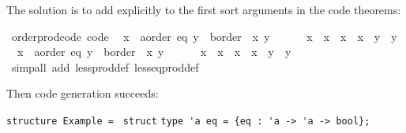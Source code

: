 \begin{isabellebody}
\begin{isamarkuptext}
  The solution is to add  explicitly to the first sort arguments in the
  code theorems:%
\end{isamarkuptext}%
\isamarkuptrue%
%
\isadelimquoteme
%
\endisadelimquoteme
%
\isatagquoteme
{}\isamarkupfalse%
\ order{\isacharunderscore}prod{\isacharunderscore}code\ {\isacharbrackleft}code{\isacharbrackright}{\isacharcolon}\isanewline
\ \ {\isachardoublequoteopen}{\isacharparenleft}x{}\ {\isasymColon}\ {\isacharprime}a{\isasymColon}{\isacharbraceleft}order{\isacharcomma}\ eq{\isacharbraceright}{\isacharcomma}\ y{}\ {\isasymColon}\ {\isacharprime}b{\isasymColon}order{\isacharparenright}\ {\isacharless}\ {\isacharparenleft}x{}{\isacharcomma}\ y{}{\isacharparenright}\ {\isasymlongleftrightarrow}\isanewline
\ \ \ \ \ x{}\ {\isacharless}\ x{}\ {\isasymor}\ x{}\ {\isacharequal}\ x{}\ {\isasymand}\ y{}\ {\isacharless}\ y{}{\isachardoublequoteclose}\isanewline
\ \ {\isachardoublequoteopen}{\isacharparenleft}x{}\ {\isasymColon}\ {\isacharprime}a{\isasymColon}{\isacharbraceleft}order{\isacharcomma}\ eq{\isacharbraceright}{\isacharcomma}\ y{}\ {\isasymColon}\ {\isacharprime}b{\isasymColon}order{\isacharparenright}\ {\isasymle}\ {\isacharparenleft}x{}{\isacharcomma}\ y{}{\isacharparenright}\ {\isasymlongleftrightarrow}\isanewline
\ \ \ \ \ x{}\ {\isacharless}\ x{}\ {\isasymor}\ x{}\ {\isacharequal}\ x{}\ {\isasymand}\ y{}\ {\isasymle}\ y{}{\isachardoublequoteclose}\isanewline
\ \ \isamarkupfalse%
\ {\isacharparenleft}simp{\isacharunderscore}all\ add{\isacharcolon}\ less{\isacharunderscore}prod{\isacharunderscore}def\ less{\isacharunderscore}eq{\isacharunderscore}prod{\isacharunderscore}def{\isacharparenright}%
\endisatagquoteme
{\isafoldquoteme}%
%
\isadelimquoteme
%
\endisadelimquoteme
%
\begin{isamarkuptext}%
\noindent Then code generation succeeds:%
\end{isamarkuptext}%
\isamarkuptrue%
%
\isadelimquoteme
%
\endisadelimquoteme
%
\isatagquoteme
%
\begin{isamarkuptext}%
\isaverbatim%
\noindent%
\verb|structure Example = |\newline%
\verb|struct|\newline%
\newline%
\verb|type 'a eq = {eq : 'a -> 'a -> bool};|\newline%

\end{isamarkuptext}
\end{isabellebody}
